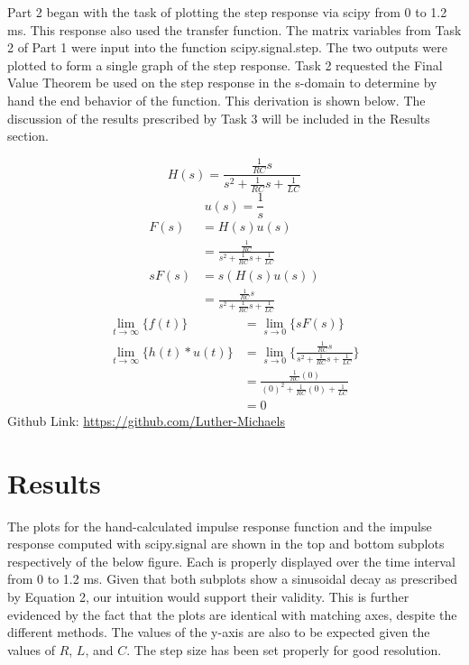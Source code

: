 \documentclass[12pt]{report}
\begin{document}
Part 2 began with the task of plotting the step response via scipy from 0 to 1.2 ms. This response also used the transfer function. The matrix variables from Task 2 of Part 1 were input into the function scipy.signal.step. The two outputs were plotted to form a single graph of the step response. Task 2 requested the Final Value Theorem be used on the step response in the s-domain to determine by hand the end behavior of the function. This derivation is shown below. The discussion of the results prescribed by Task 3 will be included in the Results section. 

\begin{equation*}
	H(s) = \frac{\frac{1}{RC}s}{s^2 + \frac{1}{RC}s + \frac{1}{LC}}
\end{equation*}
\begin{equation*}
	u(s) = \frac{1}{s}
\end{equation*}
\begin{align*}
	F(s) &= H(s)u(s) \\
	&= \frac{\frac{1}{RC}}{s^2 + \frac{1}{RC}s + \frac{1}{LC}} \\
	sF(s) &= s(H(s)u(s)) \\
	&= \frac{\frac{1}{RC}s}{s^2 + \frac{1}{RC}s + \frac{1}{LC}}
\end{align*}
\begin{align*}
	\lim_{t\rightarrow \infty}\{f(t)\} &= \lim_{s\rightarrow 0}\{sF(s)\} \\
	\lim_{t\rightarrow \infty}\{h(t) * u(t)\} &= \lim_{s\rightarrow 0}\{\frac{\frac{1}{RC}s}{s^2 + \frac{1}{RC}s + \frac{1}{LC}}\} \\
	&= \frac{\frac{1}{RC}(0)}{(0)^2 + \frac{1}{RC}(0) + \frac{1}{LC}} \\
	&= 0
\end{align*}
Github Link: \url{https://github.com/Luther-Michaels} \\
	
\section{Results}

The plots for the hand-calculated impulse response function and the impulse response computed with scipy.signal are shown in the top and bottom subplots respectively of the below figure. Each is properly displayed over the time interval from 0 to 1.2 ms. Given that both subplots show a sinusoidal decay as prescribed by Equation 2, our intuition would support their validity. This is further evidenced by the fact that the plots are identical with matching axes, despite the different methods. The values of the y-axis are also to be expected given the values of $ R $, $ L $, and $ C $. The step size has been set properly for good resolution. \\ 
\end{document}
